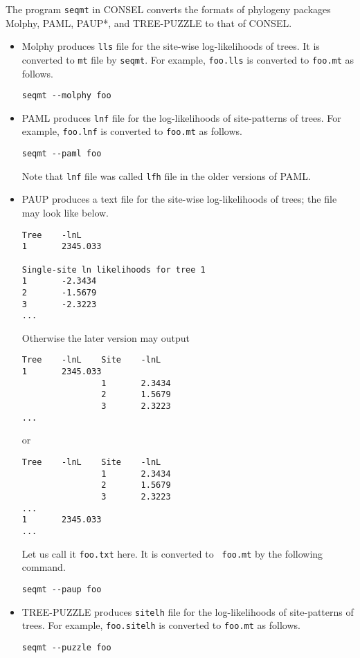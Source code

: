 \documentclass[12pt]{article}
\begin{document}
The program {\tt seqmt} in CONSEL converts the formats of phylogeny
packages Molphy, PAML, PAUP*, and TREE-PUZZLE to that of CONSEL.
\begin{itemize}
 \item Molphy produces {\tt lls} file for the site-wise log-likelihoods
       of trees. It is converted to {\tt mt} file by {\tt seqmt}. For
       example, {\tt foo.lls} is converted to {\tt foo.mt} as follows.
\begin{verbatim}
seqmt --molphy foo
\end{verbatim}
 \item PAML produces {\tt lnf} file for the log-likelihoods of
       site-patterns of trees.  For example, {\tt foo.lnf} is converted
       to {\tt foo.mt} as follows.
\begin{verbatim}
seqmt --paml foo
\end{verbatim}
       Note that {\tt lnf} file was called {\tt lfh} file in the older
       versions of PAML.
 \item PAUP produces a text file for the site-wise log-likelihoods of
       trees; the file may look like below.
\begin{verbatim}
Tree    -lnL
1       2345.033

Single-site ln likelihoods for tree 1
1       -2.3434
2       -1.5679
3       -2.3223
...
\end{verbatim}
       Otherwise the later version may output
\begin{verbatim}
Tree    -lnL    Site    -lnL
1       2345.033
                1       2.3434
                2       1.5679
                3       2.3223
...
\end{verbatim}
or
\begin{verbatim}
Tree    -lnL    Site    -lnL
                1       2.3434
                2       1.5679
                3       2.3223
...
1       2345.033
...
\end{verbatim}
       Let us call it {\tt foo.txt} here.  It is converted to {\tt
       foo.mt} by the following command.
\begin{verbatim}
seqmt --paup foo
\end{verbatim}
 \item TREE-PUZZLE produces {\tt sitelh} file for the log-likelihoods of
       site-patterns of trees.  For example, {\tt foo.sitelh} is converted
       to {\tt foo.mt} as follows.
\begin{verbatim}
seqmt --puzzle foo
\end{verbatim}
\end{itemize}
\end{document}
